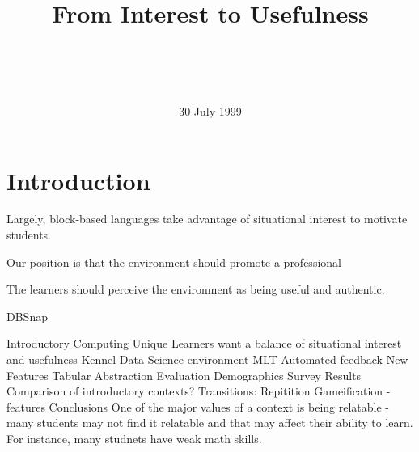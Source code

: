 \documentclass{sig-alternate}
\begin{document}
%
\title{From Interest to Usefulness}
\author{
	\\
	\\
	  \\
}
\date{30 July 1999}

\maketitle
\begin{abstract}

\end{abstract}





\section{Introduction}

Largely, block-based languages take advantage of situational interest to motivate students.

Our position is that the environment should promote a professional 

The learners should perceive the environment as being useful and authentic.

DBSnap

Introductory Computing
	Unique Learners want a balance of situational interest and usefulness
Kennel
	Data Science environment
	MLT
	Automated feedback
New Features
	Tabular Abstraction
Evaluation
	Demographics
	Survey
Results
	Comparison of introductory contexts?
	Transitions: 
	Repitition
	Gameification - features
Conclusions
	One of the major values of a context is being relatable - many students may not find it relatable and that may affect their ability to learn. For instance, many studnets have weak math skills.
\end{document}
